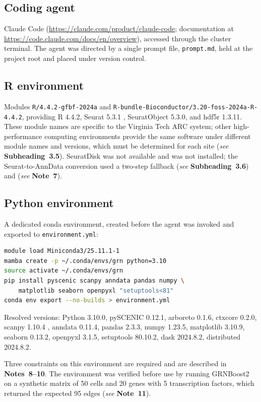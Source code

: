 \documentclass[11pt,a4paper]{article}
\newcommand{\seenote}[1]{(\textit{see} \textbf{Note~#1})}
\newcommand{\seesub}[1]{(\textit{see} \textbf{Subheading~#1})}
\begin{document}
\subsection{Coding agent}

Claude Code (\url{https://claude.com/product/claude-code}; documentation at \url{https://code.claude.com/docs/en/overview}), accessed through the cluster terminal. The agent was directed by a single prompt file, \texttt{prompt.md}, held at the project root and placed under version control.

\subsection{R environment}

Modules \texttt{R/4.4.2-gfbf-2024a} and \texttt{R-bundle-Bioconductor/3.20-foss-2024a-R-4.4.2}, providing R 4.4.2, Seurat 5.3.1 \cite{hao2024}, SeuratObject 5.3.0, and hdf5r 1.3.11. These module names are specific to the Virginia Tech ARC system; other high-performance computing environments provide the same software under different module names and versions, which must be determined for each site \seesub{3.5}. SeuratDisk was not available and was not installed; the Seurat-to-AnnData conversion used a two-step fallback \seesub{3.6} and \seenote{7}.

\subsection{Python environment}

A dedicated conda environment, created before the agent was invoked and exported to \texttt{environment.yml}:

\begin{lstlisting}[language=bash]
module load Miniconda3/25.11.1-1
mamba create -p ~/.conda/envs/grn python=3.10
source activate ~/.conda/envs/grn
pip install pyscenic scanpy anndata pandas numpy \
    matplotlib seaborn openpyxl "setuptools<81"
conda env export --no-builds > environment.yml
\end{lstlisting}

Resolved versions: Python 3.10.0, pySCENIC 0.12.1, arboreto 0.1.6, ctxcore 0.2.0, scanpy 1.10.4 \cite{wolf2018}, anndata 0.11.4, pandas 2.3.3, numpy 1.23.5, matplotlib 3.10.9, seaborn 0.13.2, openpyxl 3.1.5, setuptools 80.10.2, dask 2024.8.2, distributed 2024.8.2.

Three constraints on this environment are required and are described in \textbf{Notes~8--10}. The environment was verified before use by running GRNBoost2 on a synthetic matrix of 50 cells and 20 genes with 5 transcription factors, which returned the expected 95 edges \seenote{11}.
\end{document}
